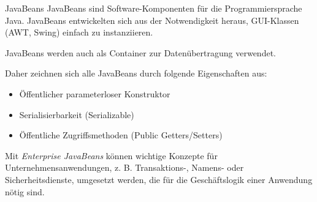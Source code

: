 \begin{defi}{JavaBeans}
    JavaBeans sind Software-Komponenten für die Programmiersprache Java.
    JavaBeans entwickelten sich aus der Notwendigkeit heraus, GUI-Klassen (AWT, Swing) einfach zu instanziieren.

    JavaBeans werden auch als Container zur Datenübertragung verwendet.

    Daher zeichnen sich alle JavaBeans durch folgende Eigenschaften aus:
    \begin{itemize}
        \item Öffentlicher parameterloser Konstruktor
        \item Serialisierbarkeit (Serializable)
        \item Öffentliche Zugriffsmethoden (Public Getters/Setters)
    \end{itemize}

    Mit \emph{Enterprise JavaBeans} können wichtige Konzepte für Unternehmensanwendungen, z. B. Transaktions-, Namens- oder Sicherheitsdienste, umgesetzt werden, die für die Geschäftslogik einer Anwendung nötig sind.
\end{defi}